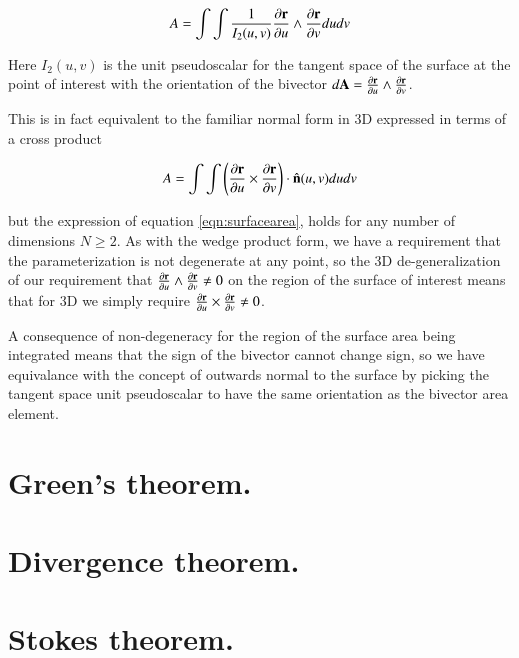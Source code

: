 \documentclass{article}
\newcommand{\PD}[2]{\frac{\partial {#2}}{\partial {#1}}}
\begin{document}
\begin{equation}\label{eqn:surfacearea}
A = \int\int \inv{I_2(u,v)} \PD{u}{\Br} \wedge \PD{v}{\Br} du dv
\end{equation}

Here $I_2(u,v)$ is the unit pseudoscalar for the tangent space of the surface at the point of interest with the orientation of the bivector 
$d\BA = \PD{u}{\Br} \wedge \PD{v}{\Br}$.

This is in fact equivalent to the familiar normal form in 3D expressed in terms
of a cross product

\begin{equation}
A = \int\int \left(\PD{u}{\Br} \cross \PD{v}{\Br}\right) \cdot \ncap(u,v) du dv
\end{equation}

but the expression of equation \ref{eqn:surfacearea}, holds for any number of dimensions $N \ge 2$.  As with the wedge product form, we have a requirement that the parameterization is not degenerate at any point, so the 3D de-generalization of our requirement that
$\PD{u}{\Br} \wedge \PD{v}{\Br} \ne 0$
on the region of the surface of interest means that for 3D we simply require
$\PD{u}{\Br} \cross \PD{v}{\Br} \ne 0$.

A consequence of non-degeneracy for the region of the surface area being integrated means that the sign of the bivector cannot change sign, so we have equivalance with the concept of outwards normal to the surface by picking the tangent space unit pseudoscalar to have the same orientation as the bivector area element.

\section{ Green's theorem. }

\section{ Divergence theorem. }

\section{ Stokes theorem. }
\end{document}
